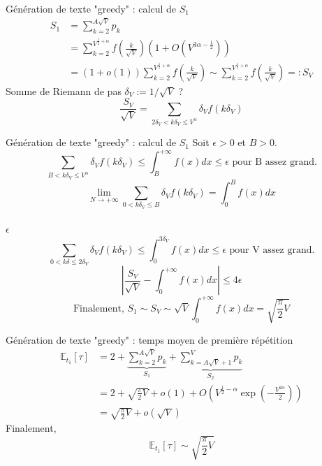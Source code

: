 \documentclass[t]{beamer}
\begin{document}
\begin{frame}{Génération de texte "greedy" : calcul de $S_1 $} %
    \begin{align*}
        S_1 &= \sum_{k=2}^{A\sqrt{V}} p_k \\
            &=\sum_{k=2}^{V^{\frac{1}{2} + \alpha}} f(\frac{k}{\sqrt{V}}) (1 + O(V^{3\alpha - \frac{1}{2}})) \\
            &= (1 + o(1)) \sum_{k=2}^{V^{\frac{1}{2} + \alpha}} f(\frac{k}{\sqrt{V}}) \sim \sum_{k=2}^{V^{\frac{1}{2} + \alpha}} f(\frac{k}{\sqrt{V}}) =: S_V
    \end{align*}
    Somme de Riemann de pas $\delta_V := 1/\sqrt{V}$ ? 
    $$\frac{S_V}{\sqrt{V}} = \sum_{2 \delta_V < k\delta_V \leq V^{\alpha}} \delta_V f(k\delta_V)$$
\end{frame}

\begin{frame}{Génération de texte "greedy" : calcul de $S_1 $} %
    Soit $\epsilon > 0$ et $B>0$. 
    $$ \sum_{B < k\delta_V \leq V^{\alpha}} \delta_V f(k\delta_V) \leq \int_{B}^{+ \infty} f(x) dx \leq \epsilon \text{    pour B assez grand.} $$
    $$ \lim_{N \longrightarrow +\infty} \sum_{0 < k\delta_V \leq B} \delta_V f(k\delta_V) = \int_{0}^{B} f(x)dx $$ \\
     $\epsilon$  \\
    $$ \sum_{0 < k\delta \leq 2\delta_V}  \delta_V f(k\delta_V) \leq \int_{0}^{3\delta_V} f(x) dx \leq \epsilon \text{    pour V assez grand.} $$
    $$|\frac{S_V}{\sqrt{V}} - \int_{0}^{+ \infty} f(x)dx| \leq 4 \epsilon $$ 
    $$\text{Finalement,   } S_1 \sim S_V \sim \sqrt{V} \int_{0}^{+ \infty} f(x)dx = \sqrt{\frac{\pi}{2}V}$$
\end{frame}

\begin{frame}{Génération de texte "greedy" : temps moyen de première répétition} %
    \[
        \begin{aligned}
            \mathbb{E}_{t_1}[\tau] &= 2 + \underbrace{\sum_{k=2}^{A\sqrt{V}} p_k}_{S_1} + \underbrace{\sum_{k=A\sqrt{V}+1}^{V} p_k}_{S_2} \\
            &= 2 + \sqrt{\frac{\pi}{2}V} + o(1) + O(V^{\frac{1}{2} - \alpha} \exp(-\frac{V^{2\alpha}}{2})) \\
            & = \sqrt{\frac{\pi}{2}V} + o(\sqrt{V})
        \end{aligned}
    \]
    Finalement, 
    $$ \mathbb{E}_{t_1}[\tau] \sim \sqrt{\frac{\pi}{2}V} $$
\end{frame}
\end{document}
